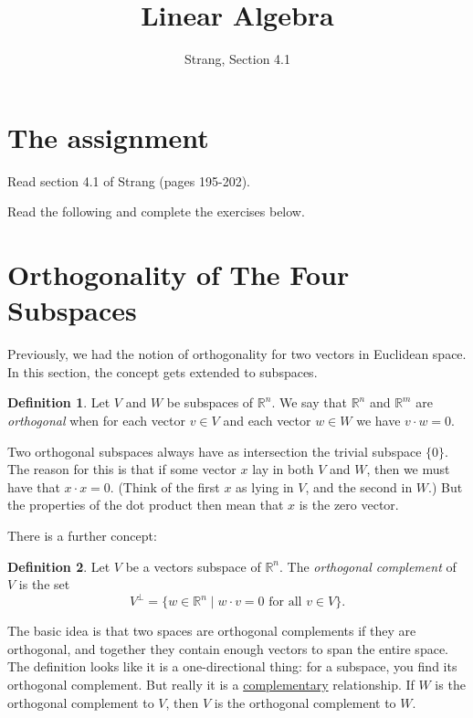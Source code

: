 \documentclass[11pt]{amsart}
\theoremstyle{definition}
\newtheorem*{definition}{Definition}
\begin{document}
\title{Linear Algebra}
\author{Strang, Section 4.1}
\maketitle

\section{The assignment}
\begin{compactitem}
\item Read section 4.1 of Strang (pages 195-202).
\item Read the following and complete the exercises below.
\end{compactitem}


\section{Orthogonality of The Four Subspaces}


Previously, we had the notion of orthogonality for two vectors in Euclidean space. In this section, the concept gets extended to subspaces.
\begin{definition}
Let $V$ and $W$ be subspaces of $\mathbb{R}^n$. We say that $\mathbb{R}^n$ and $\mathbb{R}^m$ are \emph{orthogonal} when for each vector $v \in V$ and each vector $w \in W$ we have $v \cdot w =0$.
\end{definition}

Two orthogonal subspaces always have as intersection the trivial subspace $\{ 0\}$. The reason for this is that if some vector $x$ lay in both $V$ and $W$, then we must have that $x \cdot x =0$. (Think of the first $x$ as lying in $V$, and the second in $W$.) But the properties of the dot product then mean that $x$ is the zero vector.

There is a further concept:

\begin{definition}
Let $V$ be a vectors subspace of $\mathbb{R}^n$. The \emph{orthogonal complement} of $V$ is the set
\[
V^{\perp} = \{ w \in \mathbb{R}^n \mid w \cdot v = 0 \text{ for all } v \in V \}.
\]
\end{definition}

The basic idea is that two spaces are orthogonal complements if they are orthogonal, and together they contain enough vectors to span the entire space. The definition looks like it is a one-directional thing: for a subspace, you find its orthogonal complement. But really it is a \underline{complementary} relationship. If $W$ is the orthogonal complement to $V$, then $V$ is the orthogonal complement to $W$.
\end{document}
